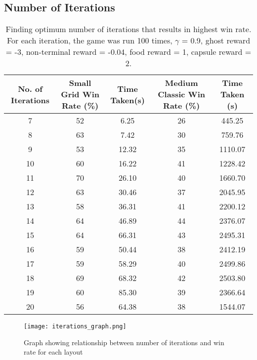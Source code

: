 \documentclass[12pt]{report}
\begin{document}
        \subsection*{Number of Iterations}
          \begin{table}[H]
            \begin{center}
              \begin{adjustbox}{max width=\textwidth}
              \begin{tabular}{*{5}{c}}
                \textbf{No. of Iterations} & \textbf{Small Grid Win Rate (\%)} & \textbf{Time Taken(s)} & \textbf{Medium Classic Win Rate (\%)} & \textbf{Time Taken (s)}\\
                \hline
                7 & 52 & 6.25 & 26 & 445.25\\
                8 & 63 & 7.42  & 30 & 759.76\\
                9 & 53 & 12.32  & 35 & 1110.07\\
                10 & 60 & 16.22 & 41 & 1228.42\\
                11 & 70 & 26.10 & 40 & 1660.70\\
                12 & 63 & 30.46 & 37 & 2045.95\\
                13 & 58 & 36.31 & 41 & 2200.12\\
                14 & 64 & 46.89 & 44 & 2376.07\\
                15 & 64 & 66.31 & 43 & 2495.31\\
                16 & 59 & 50.44 & 38 & 2412.19\\
                17 & 59 & 58.29 & 40 & 2499.86\\
                18 & 69 & 68.32 & 42 & 2503.80\\
                19 & 60 & 85.30 & 39 & 2366.64\\
                20 & 56 & 64.38 & 38 & 1544.07\\
              \end{tabular}
              \end{adjustbox}
              \caption{Finding optimum number of iterations that results in highest win rate. For each iteration, the game was run 100 times, $\gamma$ = 0.9, ghost reward = -3, non-terminal reward = -0.04, food reward = 1, capsule reward = 2.}
              \label{tab:table2}
            \end{center}
          \end{table}
          \vspace{-13mm}
        \begin{figure}[H]
          \centering
            \texttt{[image: iterations\_graph.png]}
            \caption{Graph showing relationship between number of iterations and win rate for each layout}
        \end{figure}
\end{document}
